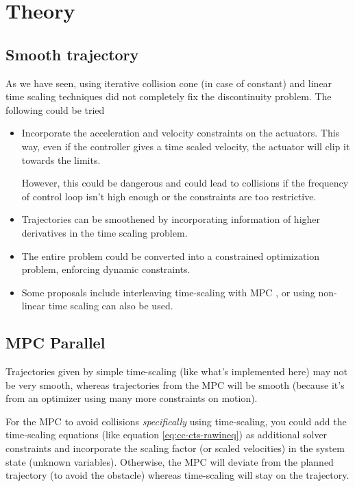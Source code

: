 
\section{Theory}

\subsection{Smooth trajectory}

As we have seen, using iterative collision cone (in case of constant) and linear time scaling techniques did not completely fix the discontinuity problem. The following could be tried

\begin{itemize}
    \item Incorporate the acceleration and velocity constraints on the actuators. This way, even if the controller gives a time scaled velocity, the actuator will clip it towards the limits.
    
    However, this could be dangerous and could lead to collisions if the frequency of control loop isn't high enough or the constraints are too restrictive.
    
    \item Trajectories can be smoothened by incorporating information of higher derivatives in the time scaling problem.
    \item The entire problem could be converted into a constrained optimization problem, enforcing dynamic constraints.
    
    \item Some proposals include interleaving time-scaling with MPC \cite{tscc-mpc-2}, or using non-linear time scaling \cite{tscc-mpc-1} can also be used. 
\end{itemize}

\subsection{MPC Parallel}

Trajectories given by simple time-scaling (like what's implemented here) may not be very smooth, whereas trajectories from the MPC will be smooth (because it's from an optimizer using many more constraints on motion).

For the MPC to avoid collisions \emph{specifically} using time-scaling, you could add the time-scaling equations (like equation \ref{eq:cc-cts-rawineq}) as additional solver constraints and incorporate the scaling factor (or scaled velocities) in the system state (unknown variables). Otherwise, the MPC will deviate from the planned trajectory (to avoid the obstacle) whereas time-scaling will stay on the trajectory.

